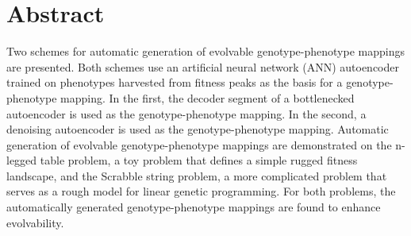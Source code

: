 \section{Abstract} \label{sec:abstract}

Two schemes for automatic generation of evolvable genotype-phenotype mappings are presented. Both schemes use an artificial neural network (ANN) autoencoder trained on phenotypes harvested from fitness peaks as the basis for a genotype-phenotype mapping. In the first, the decoder segment of a bottlenecked autoencoder is used as the genotype-phenotype mapping. In the second, a denoising autoencoder is used as the genotype-phenotype mapping. Automatic generation of evolvable genotype-phenotype mappings are demonstrated on the n-legged table problem, a toy problem that defines a simple rugged fitness landscape, and the Scrabble string problem, a more complicated problem that serves as a rough model for linear genetic programming. For both problems, the automatically generated genotype-phenotype mappings are found to enhance evolvability.
